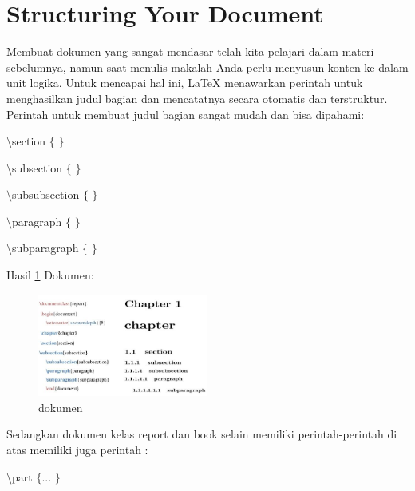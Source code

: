 \section{Structuring Your Document}

\hspace{0.50in} Membuat dokumen yang sangat mendasar telah kita pelajari dalam materi sebelumnya, namun saat menulis makalah Anda perlu menyusun konten ke dalam unit logika. Untuk mencapai hal ini, LaTeX menawarkan perintah untuk menghasilkan judul bagian dan mencatatnya secara otomatis dan terstruktur. Perintah untuk membuat judul bagian sangat mudah dan bisa dipahami: \par
{\fontsize{10pt}{10pt}\selectfont  $  \setminus  $section $  \{  $ $  \}  $}
 \par
{\fontsize{10pt}{10pt}\selectfont  $  \setminus  $subsection $  \{  $ $  \}  $}
 \par
{\fontsize{10pt}{10pt}\selectfont  $  \setminus  $subsubsection $  \{  $ $  \}  $}
 \par
{\fontsize{10pt}{10pt}\selectfont  $  \setminus  $paragraph $  \{  $ $  \}  $}
 \par
{\fontsize{10pt}{10pt}\selectfont  $  \setminus  $subparagraph $  \{  $ $  \}  $}
 \par

Hasil \ref{dokumen} Dokumen:
\begin{figure}[ht]
	\centerline{\includegraphics[width=0.50\textwidth]{gambar/dokumen}}
	\caption{dokumen}
	\label{dokumen}
\end{figure}

\vspace{50pt}
\hspace{0.50in} Sedangkan dokumen kelas report dan book selain memiliki perintah-perintah di atas memiliki juga perintah :
 \par
{\fontsize{10pt}{10pt}\selectfont  $  \setminus  $part $  \{  $... $  \}  $}
 \par
\vspace{9pt}

